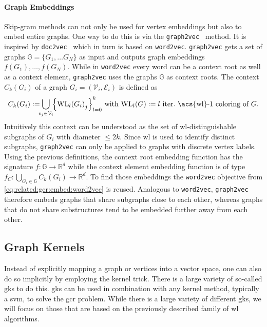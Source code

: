 \paragraph{Graph Embeddings}
Skip-gram methods can not only be used for vertex embeddings but also to embed entire graphs.
One way to do this is via the \texttt{graph2vec}~\cite{Narayanan2017} method.
It is inspired by \texttt{doc2vec}~\cite{Le2014} which in turn is based on \texttt{word2vec}.
\texttt{graph2vec} gets a set of graphs $\mathbb{G} = \{ G_1, \dots G_N \}$ as input and outputs graph embeddings $f(G_1), \dots, f(G_N)$.
While in \texttt{word2vec} every word can be a context root as well as a context element, \texttt{graph2vec} uses the graphs $\mathbb{G}$ as context roots.
The context $C_k(G_i)$ of a graph $G_i = (\mathcal{V}_i, \mathcal{E}_i)$ is defined as
\begin{equation}
	C_k(G_i) := \bigcup_{\mathclap{v_j \in \mathcal{V}_i}}\, {\left\{ {\textrm{WL}_l(G_i)}_j \right\}}_{l = 0}^k %
	\text{ with } \textrm{WL}_l(G) := \text{$l$ iter.\ \acs{wl}-1 coloring of $G$.}
\end{equation}
Intuitively this context can be understood as the set of \acs{wl}-distinguishable subgraphs of $G_i$ with diameter $\leq 2k$.
Since \ac{wl} is used to identify distinct subgraphs, \texttt{graph2vec} can only be applied to graphs with discrete vertex labels.
Using the previous definitions, the context root embedding function has the signature $f: \mathbb{G} \to \mathbb{R}^d$ while the context element embedding function is of type $f_C: \bigcup_{G_i \in \mathbb{G}} C_k(G_i) \to \mathbb{R}^d$.
To find those embeddings the \texttt{word2vec} objective from \cref{eq:related:gcr:embed:word2vec} is reused.
Analogous to \texttt{word2vec}, \texttt{graph2vec} therefore embeds graphs that share subgraphs close to each other, whereas graphs that do not share substructures tend to be embedded further away from each other.

\subsection{Graph Kernels}%
\label{sec:related:gcr:kernel}

Instead of explicitly mapping a graph or vertices into a vector space, one can also do so implicitly by employing the kernel trick.
There is a large variety of so-called \acp{gk} to do this.
\acp{gk} can be used in combination with any kernel method, typically a \ac{svm}, to solve the \ac{gcr} problem.
While there is a large variety of different \acp{gk}, we will focus on those that are based on the previously described family of \ac{wl} algorithms.

